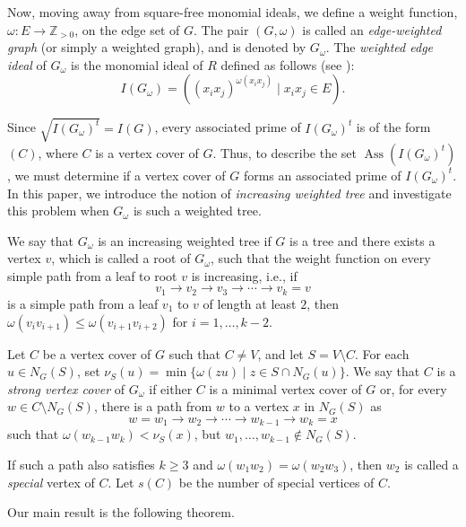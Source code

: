 \documentclass[12pt,amscd]{amsart}
\DeclareMathOperator{\ass}{Ass}
\theoremstyle{definition}
\def\Z {\mathbb Z}
\begin{document}
Now, moving away from square-free monomial ideals, we define  a weight function, $\omega \colon E \to \Z_{>0}$, on the edge set of $G$. The pair $(G,\omega)$  is called an {\it edge-weighted graph} (or simply a weighted graph), and is denoted by  $G_\omega$. The {\it weighted edge ideal} of $G_\omega$ is the monomial ideal of $R$ defined as follows (see \cite{PS}):
$$I(G_\omega) = ((x_ix_j)^{\omega(x_ix_j)}\mid x_i x_j\in E).$$

Since $\sqrt{I(G_\omega)^t} = I(G)$,  every associated prime of $I(G_\omega)^t$ is of the form $(C)$,  where $C$ is a vertex cover of $G$. Thus,  to describe the set $\ass(I(G_\omega)^t)$,  we  must determine if a vertex cover of $G$ forms an associated prime of $I(G_\omega)^t$. In this paper, we introduce the notion of {\it increasing weighted tree} and investigate this problem  when $G_\omega$ is such a weighted tree.

We say that $G_\omega$ is an increasing weighted tree if $G$  is a tree and there exists a vertex $v$, which is called a root of $G_\omega$, such that the weight function on every simple path from a leaf to root $v$ is increasing, i.e.,
 if
$$v_1\to v_2\to v_3\to \cdots \to v_k =v$$
is a  simple path from a leaf $v_1$ to $v$ of length at least $2$, then $\omega(v_iv_{i+1}) \leqslant \omega(v_{i+1}v_{i+2})$ for $i=1,\ldots, k-2$.

Let $C$ be a vertex cover  of $G$ such that $C\ne V$, and let $S = V\setminus C$. For each $u\in N_G(S)$, set $\nu_S(u) = \min\{\omega(zu)\mid z\in S \cap N_G(u)\}$. We say that $C$ is a {\it strong vertex cover} of $G_\omega$  if either $C$ is a minimal vertex cover of $G$ or, for every $w\in C \setminus N_G(S)$, there is a path from $w$ to a vertex $x$ in $N_G(S)$ as
$$w=w_1\to w_2\to \cdots  \to w_{k-1}\to w_k=x
$$
such that $\omega(w_{k-1}w_k) < \nu_S(x)$, but $w_1,\ldots,w_{k-1}\notin N_G(S)$.

If such a path also satisfies   $k\geqslant 3$ and $\omega(w_1w_2)=\omega(w_2w_3)$, then $w_2$ is called a {\it special} vertex of $C$. Let   $s(C)$ be the number of special vertices of $C$.

\medskip



Our main result is the following theorem.

\medskip

\end{document}
